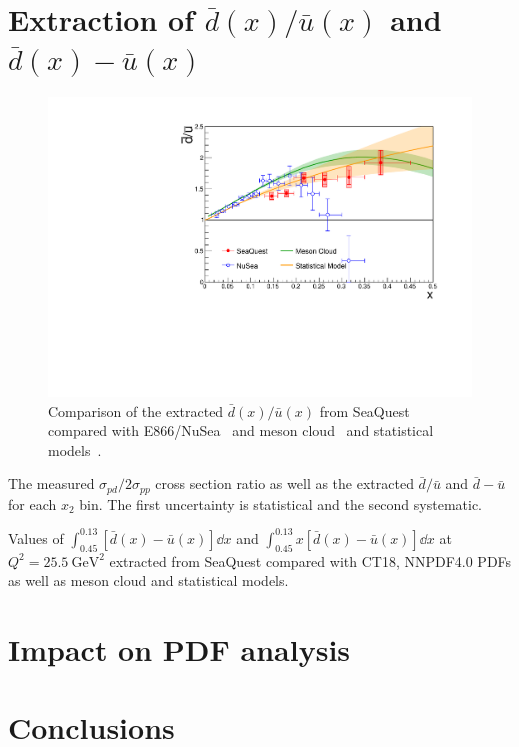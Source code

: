 \documentclass[reprint,aps,unsortedaddress,superscriptaddress,prd,floatfix,showpacs,linenumbers]{revtex4-2}
\begin{document}
\section{Extraction of \texorpdfstring{$\bar{d}\left(x\right)/\bar{u}\left(x\right)$}{dbar(x)/ubar(x)}
	and \texorpdfstring{$\bar{d}\left(x\right)-\bar{u}\left(x\right)$}{dbar(x)-ubar(x)}}
\begin{figure}[htbp!]
	\centering
	\includegraphics[width=\linewidth]{E906_E866_dbarubar}
	\caption{Comparison of the extracted $\bar{d}\left(x\right)/\bar{u}\left(x\right)$ from SeaQuest
		compared with E866/NuSea~\cite{towell2001} and meson cloud~\cite{alberg2022} and statistical models~\cite{soffer2019}.}
	\label{fig:dbub_ratio}
\end{figure}
\begin{table}[htbp!]
	\centering
	\caption{The measured $\sigma_{pd}/2\sigma_{pp}$ cross section ratio as well
		as the extracted $\bar{d}/\bar{u}$ and $\bar{d}-\bar{u}$ for each $x_{2}$ bin.
		The first uncertainty is statistical and the second systematic.}
	\begin{adjustbox}{max width=\textwidth}
		
	\end{adjustbox}
\end{table}
\begin{table}[htbp!]
	\centering
	\caption{Values of $\int_{0.45}^{0.13} \left[\bar{d}\left(x\right) - \bar{u}\left(x\right)\right] \dd{x}$
		and $\int_{0.45}^{0.13} x\left[\bar{d}\left(x\right) - \bar{u}\left(x\right)\right] \dd{x}$ at $Q^2=\SI{25.5}{\GeV\squared}$ extracted from
		SeaQuest compared with CT18, NNPDF4.0 PDFs as well as meson cloud and statistical models.}	
	\begin{adjustbox}{max width=\textwidth}
		
	\end{adjustbox}
\end{table}
\section{Impact on PDF analysis}

\section{Conclusions}

\begin{acknowledgments}
\end{acknowledgments}

\end{document}
